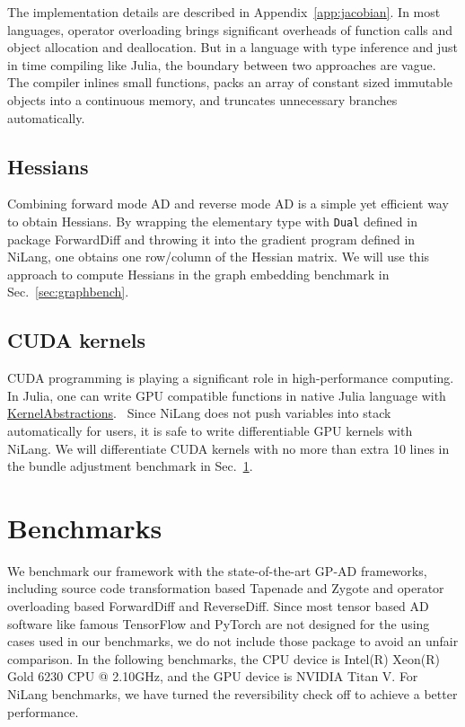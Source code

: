 \documentclass{article}
\newcommand{\<}{\langle}
\renewcommand{\>}{\rangle}
\renewcommand{\cite}[1]{{\citep{#1}}}
\newcommand{\Sec}[1]{Sec.~\ref{#1}}
\newcommand{\App}[1]{Appendix~\ref{#1}}
\theoremstyle{definition}\newtheorem{definition}{\textit{Definition}}
\begin{document}
The implementation details are described in \App{app:jacobian}.
In most languages, operator overloading brings significant overheads of function calls and object allocation and deallocation.
But in a language with type inference and just in time compiling like Julia, the boundary between two approaches are vague.
The compiler inlines small functions, packs an array of constant sized immutable objects into a continuous memory, and truncates unnecessary branches automatically.

\subsection{Hessians}
Combining forward mode AD and reverse mode AD is a simple yet efficient way to obtain Hessians.
By wrapping the elementary type with \texttt{Dual} defined in package ForwardDiff and throwing it into the gradient program defined in NiLang, one obtains one row/column of the Hessian matrix.
We will use this approach to compute Hessians in the graph embedding benchmark in \Sec{sec:graphbench}.

\subsection{CUDA kernels}
CUDA programming is playing a significant role in high-performance computing. In Julia, one can write GPU compatible functions in native Julia language with \href{https://github.com/JuliaGPU/KernelAbstractions.jl}{KernelAbstractions}.~\cite{Besard2018}
Since NiLang does not push variables into stack automatically for users, it is safe to write differentiable GPU kernels with NiLang.
We will differentiate CUDA kernels with no more than extra 10 lines in the bundle adjustment benchmark in \Sec{sec:benchmark}.

\section{Benchmarks}\label{sec:benchmark}

We benchmark our framework with the state-of-the-art GP-AD frameworks, including source code transformation based Tapenade and Zygote and operator overloading based ForwardDiff and ReverseDiff. 
Since most tensor based AD software like famous TensorFlow and PyTorch are not designed for the using cases used in our benchmarks, we do not include those package to avoid an unfair comparison.
In the following benchmarks, the CPU device is Intel(R) Xeon(R) Gold 6230 CPU @ 2.10GHz, and the GPU device is NVIDIA Titan V.
For NiLang benchmarks, we have turned the reversibility check off to achieve a better performance.
\end{document}
